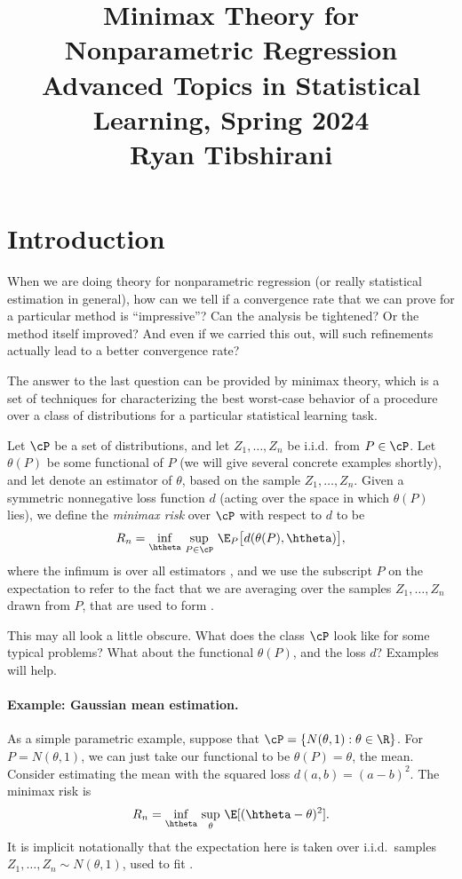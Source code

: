 \documentclass{article}
\title{Minimax Theory for Nonparametric Regression \\ \smallskip
\large Advanced Topics in Statistical Learning, Spring 2024 \\ \smallskip
Ryan Tibshirani}
\author{}
\date{}
\begin{document}
\maketitle
\RaggedRight
\vspace{-50pt}

\section{Introduction}

When we are doing theory for nonparametric regression (or really statistical
estimation in general), how can we tell if a convergence rate that we can prove
for a particular method is ``impressive''? Can the analysis be tightened? Or the
method itself improved? And even if we carried this out, will such refinements 
actually lead to a better convergence rate?   

The answer to the last question can be provided by minimax theory, which is a
set of techniques for characterizing the best worst-case behavior of a procedure
over a class of distributions for a particular statistical learning task. 

Let $\cP$ be a set of distributions, and let $Z_1,\dots,Z_n$ be i.i.d.\ from $P
\in \cP$. Let $\theta(P)$ be some functional of $P$ (we will give several
concrete examples shortly), and let 
denote an estimator of $\theta$, based on the sample $Z_1,\dots,Z_n$.  Given a
symmetric nonnegative loss function $d$ (acting over the space in which 
$\theta(P)$ lies), we define the \emph{minimax risk} over $\cP$ with respect to
$d$ to be   
\[
R_n = \inf_{\htheta} \, \sup_{P \in \cP} \, \E_P \big[ d(\theta(P), \htheta)
\big],  
\]
where the infimum is over all estimators \smash{$\htheta$}, and we use the
subscript $P$ on the expectation to refer to the fact that we are averaging over
the samples $Z_1,\dots,Z_n$ drawn from $P$, that are used to form
\smash{$\htheta$}.       

This may all look a little obscure. What does the class $\cP$ look like for some
typical problems? What about the functional $\theta(P)$, and the loss $d$?
Examples will help.    

\paragraph{Example: Gaussian mean estimation.}

As a simple parametric example, suppose that $\cP = \{ N(\theta,1) : \theta \in
\R\}$. For $P = N(\theta, 1)$, we can just take our functional to be $\theta(P)=
\theta$, the mean. Consider estimating the mean with the squared loss $d(a, b) 
= (a-b)^2$. The minimax risk is   
\[
R_n = \inf_{\htheta} \, \sup_\theta \, \E[ (\htheta - \theta)^2].
\]
It is implicit notationally that the expectation here is taken over i.i.d.\
samples $Z_1,\dots,Z_n \sim N(\theta,1)$, used to fit \smash{$\htheta$}.
\end{document}
